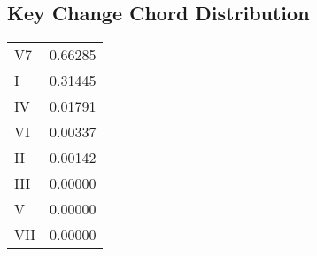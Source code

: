 \subsection{Key Change Chord Distribution}
\begin{tabular}{l l}
V7 & 0.66285 \\
I & 0.31445 \\
IV & 0.01791 \\
VI & 0.00337 \\
II & 0.00142 \\
III & 0.00000 \\
V & 0.00000 \\
VII & 0.00000 \\
\end{tabular}
